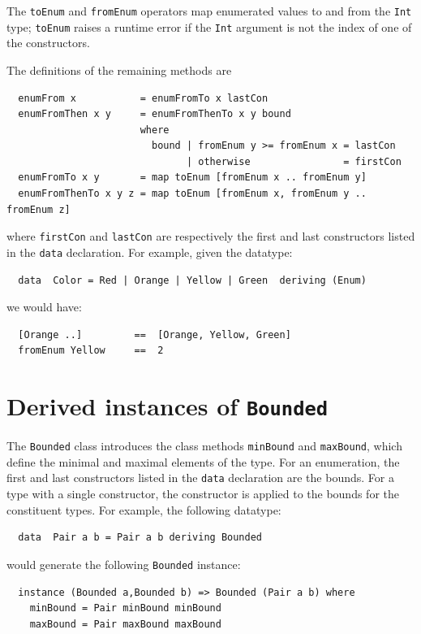 The \mbox{\tt toEnum} and \mbox{\tt fromEnum} operators map enumerated values to and
from the \mbox{\tt Int} type; \mbox{\tt toEnum} raises a runtime error if the \mbox{\tt Int} argument
is not the index of one of the constructors.

The definitions of the remaining methods are 
\par
{\small
\bprog
{\small\begin{verbatim}
  enumFrom x           = enumFromTo x lastCon
  enumFromThen x y     = enumFromThenTo x y bound
                       where
                         bound | fromEnum y >= fromEnum x = lastCon
                               | otherwise                = firstCon
  enumFromTo x y       = map toEnum [fromEnum x .. fromEnum y]
  enumFromThenTo x y z = map toEnum [fromEnum x, fromEnum y .. fromEnum z]
\end{verbatim}}
\eprog
}
where \mbox{\tt firstCon} and \mbox{\tt lastCon} are respectively the first and last
constructors listed in the \mbox{\tt data} declaration.
For example,
given the datatype:
\bprog
{\small\begin{verbatim}
  data  Color = Red | Orange | Yellow | Green  deriving (Enum)
\end{verbatim}}
\eprog
we would have:
\bprog
{\small\begin{verbatim}
  [Orange ..]         ==  [Orange, Yellow, Green]
  fromEnum Yellow     ==  2
\end{verbatim}}
\eprog

\section{Derived instances of \texorpdfstring{\mbox{\tt Bounded}}{Bounded}}
The \mbox{\tt Bounded} class introduces the class
methods 
\mbox{\tt minBound} and
\mbox{\tt maxBound},
which define the minimal and maximal elements of the type.
For an enumeration, the first and last constructors listed in the
\mbox{\tt data} declaration are the bounds.  For a type with a single
constructor, the constructor is applied to the bounds for the
constituent types.  For example, the following datatype:
\bprog
{\small\begin{verbatim}
  data  Pair a b = Pair a b deriving Bounded
\end{verbatim}}
\eprog
would generate the following \mbox{\tt Bounded} instance:
\bprog
{\small\begin{verbatim}
  instance (Bounded a,Bounded b) => Bounded (Pair a b) where
    minBound = Pair minBound minBound
    maxBound = Pair maxBound maxBound
\end{verbatim}}
\eprog

